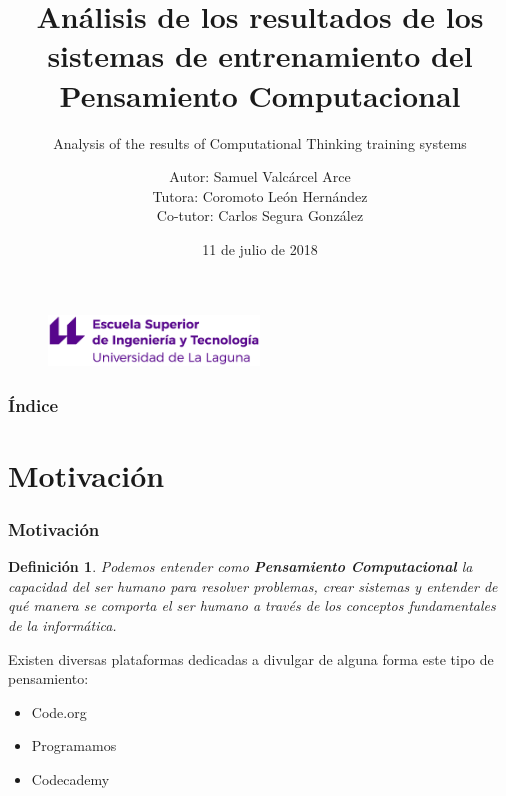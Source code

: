 \documentclass{beamer}
\title[Defensa Oral TFG]{Análisis de los resultados de los sistemas de entrenamiento del Pensamiento Computacional}
\subtitle{Analysis of the results of Computational Thinking training systems}
\author[Samuel Valcárcel Arce]{\footnotesize Autor: Samuel Valcárcel Arce \\ Tutora: Coromoto León Hernández \\ Co-tutor: Carlos Segura González}
\institute[ULL]{Universidad de La Laguna}
\date[11 de julio de 2018]{11 de julio de 2018}
\newtheorem{definicion}{Definición}
\begin{document}
  
\begin{frame}
  \begin{figure}
  \includegraphics[width=0.5\textwidth]{img/logo_nuevo.eps}
  \end{figure}
  \hspace*{7.5cm}
  \titlepage

\end{frame}

\begin{frame}
  \frametitle{Índice}  
  \tableofcontents[pausesections]
\end{frame}

\section{Motivación}

\begin{frame}

\frametitle{Motivación}

\begin{definicion}
    Podemos entender como \textbf{Pensamiento Computacional} la capacidad del ser humano para resolver problemas, crear sistemas y entender de qué manera se comporta 
    el ser humano a través de los conceptos fundamentales de la informática.
\end{definicion}

Existen diversas plataformas dedicadas a divulgar de alguna forma este tipo de pensamiento:
\begin{itemize}
    \item Code.org
    \item Programamos
    \item Codecademy
\end{itemize}

\end{frame}
\end{document}
